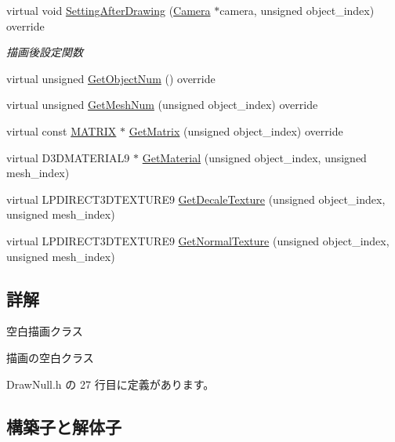\begin{DoxyCompactItemize}
virtual void \mbox{\hyperlink{class_draw_null_a76edfc5af0bf3275f96f40394aff8510}{Setting\+After\+Drawing}} (\mbox{\hyperlink{class_camera}{Camera}} $\ast$camera, unsigned object\+\_\+index) override
\begin{DoxyCompactList}\small\item\em 描画後設定関数 \end{DoxyCompactList}\item 
virtual unsigned \mbox{\hyperlink{class_draw_null_aaffa15d184f1d09512ccaa3bdad3f658}{Get\+Object\+Num}} () override
\item 
virtual unsigned \mbox{\hyperlink{class_draw_null_ad735978a85a5f3583eecd82d6bfe6413}{Get\+Mesh\+Num}} (unsigned object\+\_\+index) override
\item 
virtual const \mbox{\hyperlink{_vector3_d_8h_a032295cd9fb1b711757c90667278e744}{M\+A\+T\+R\+IX}} $\ast$ \mbox{\hyperlink{class_draw_null_adede079e9c11a756090740b20bb43022}{Get\+Matrix}} (unsigned object\+\_\+index) override
\item 
virtual D3\+D\+M\+A\+T\+E\+R\+I\+A\+L9 $\ast$ \mbox{\hyperlink{class_draw_null_a84969d22d3436986f214e9896fe44fc6}{Get\+Material}} (unsigned object\+\_\+index, unsigned mesh\+\_\+index)
\item 
virtual L\+P\+D\+I\+R\+E\+C\+T3\+D\+T\+E\+X\+T\+U\+R\+E9 \mbox{\hyperlink{class_draw_null_a8496ed1b1f765a331a8f1704122b8ca4}{Get\+Decale\+Texture}} (unsigned object\+\_\+index, unsigned mesh\+\_\+index)
\item 
virtual L\+P\+D\+I\+R\+E\+C\+T3\+D\+T\+E\+X\+T\+U\+R\+E9 \mbox{\hyperlink{class_draw_null_a41b7d148612b2d328e85289e32dc374c}{Get\+Normal\+Texture}} (unsigned object\+\_\+index, unsigned mesh\+\_\+index)
\end{DoxyCompactItemize}


\subsection{詳解}
空白描画クラス 

描画の空白クラス 

 Draw\+Null.\+h の 27 行目に定義があります。



\subsection{構築子と解体子}
\mbox{\label{class_draw_null_aa085e175e9e05fc56cb4aefa2d07f371}} 
